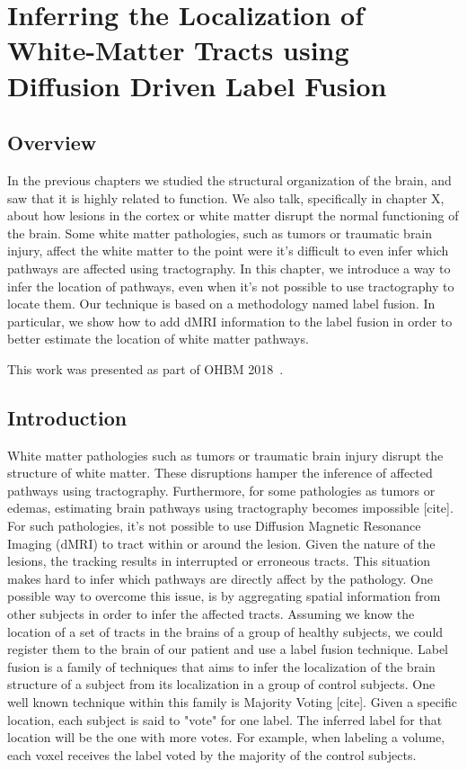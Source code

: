 \chapter{Inferring the Localization of White-Matter Tracts using Diffusion Driven Label Fusion}

\section{Overview}
In the previous chapters we studied the structural organization of the brain,
and saw that it is highly related to function. We also talk, specifically in
chapter X, about how lesions in the cortex or white matter disrupt the normal
functioning of the brain. Some white matter pathologies, such as tumors
or traumatic brain injury, affect the white matter to the point were it's
difficult to even infer which pathways are affected using tractography.
In this chapter, we introduce a way to infer the location of pathways, even
when it's not possible to use tractography to locate them. Our technique is
based on a methodology named label fusion. In particular, we show how to add
dMRI information to the label fusion in order to better estimate the location
of white matter pathways.

This work was presented as part of OHBM 2018~\cite{Guillermo2018}.

\section{Introduction}

White matter pathologies such as tumors or traumatic brain injury disrupt the
structure of white matter. These disruptions hamper the inference of affected
pathways using tractography. Furthermore, for some pathologies as tumors or
edemas, estimating brain pathways using tractography becomes impossible [cite].
For such pathologies, it's not possible to use Diffusion Magnetic Resonance
Imaging (dMRI) to tract within or around the lesion. Given the nature of the
lesions, the tracking results in interrupted or erroneous tracts. This situation
makes hard to infer which pathways are directly affect by the pathology. One
possible way to overcome this issue, is by aggregating spatial information
from other subjects in order to infer the affected tracts. Assuming we know the
location of a set of tracts in the brains of a group of healthy subjects, we
could register them to the brain of our patient and use a label fusion technique.
Label fusion is a family of techniques that aims to infer the localization of the
brain structure of a subject from its localization in a group of control subjects.
One well known technique within this family is Majority Voting [cite]. Given a
specific location, each subject is said to "vote" for one label. The inferred
label for that location will be the one with more votes. For example, when
labeling a volume, each voxel receives the label voted by the majority of the
control subjects.

